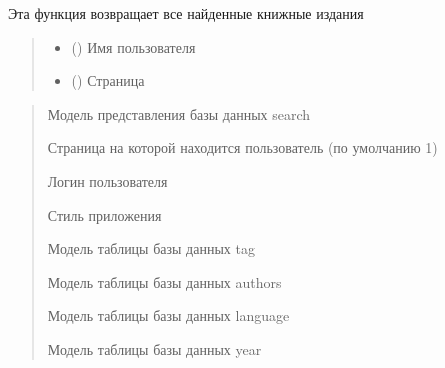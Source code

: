 \documentclass[letterpaper,10pt,russian]{sphinxmanual}
\begin{document}
\begin{fulllineitems}
\label{\detokenize{blueprints:blueprints.search_filter.search}}
\pysigstartsignatures
{}
\pysigstopsignatures
\sphinxAtStartPar
Эта функция возвращает все найденные книжные издания
\begin{quote}\begin{description}
\begin{itemize}
\item {} 
\sphinxAtStartPar
{} () \textendash{} Имя пользователя

\item {} 
\sphinxAtStartPar
{} () \textendash{} Страница

\end{itemize}

\end{description}\end{quote}
\begin{description}
\begin{quote}\begin{description}
\sphinxAtStartPar
Модель представления базы данных search

\sphinxAtStartPar
Страница на которой находится пользователь (по умолчанию 1)

\sphinxAtStartPar
Логин пользователя

\sphinxAtStartPar
Стиль приложения

\sphinxAtStartPar
Модель таблицы базы данных tag

\sphinxAtStartPar
Модель таблицы базы данных authors

\sphinxAtStartPar
Модель таблицы базы данных language

\sphinxAtStartPar
Модель таблицы базы данных year


\end{description}
\end{quote}
\end{description}
\end{fulllineitems}
\end{document}
